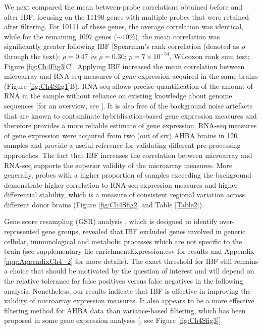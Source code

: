 We next compared the mean between-probe correlations obtained before and after IBF, focusing on the \num{11190} genes with multiple probes that were retained after filtering.
For \num{10111} of these genes, the average correlation was identical, while for the remaining \num{1097} genes ($\sim10\%$), the mean correlation was significantly greater following IBF [Spearman's rank correlation (denoted as $\rho$ through the text): $\rho = 0.47$ \textit{vs} $\rho = 0.30$; $p = 7 \times 10^{-54}$, Wilcoxon rank sum test; Figure \ref{fig:Ch4Fig3}C]. Applying IBF increased the mean correlation between microarray and RNA-seq measures of gene expression acquired in the same brains (Figure \ref{fig:Ch4Sfig1}B). RNA-seq allows precise quantification of the amount of RNA in the sample without reliance on existing knowledge about genome sequences [for an overview, see \citet{Wang2009,Kukurba2015}]. It is also free of the background noise artefacts that are known to contaminate hybridisation-based gene expression measures and therefore provides a more reliable estimate of gene expression. RNA-seq measures of gene expression were acquired from two (out of six) AHBA brains in 120 samples and provide a useful reference for validating different pre-processing approaches. The fact that IBF increases the correlation between microarray and RNA-seq supports the superior validity of the microarray measures. More generally, probes with a higher proportion of samples exceeding the background demonstrate higher correlation to RNA-seq expression measures and higher differential stability, which is a measure of consistent regional variation across different donor brains (Figure \ref{fig:Ch4Sfig2} and Table \ref{Table2}).

Gene score resampling (GSR) analysis \citep{Gillis2010}, which is designed to identify over-represented gene groups, revealed that IBF excluded genes involved in generic cellular, immunological and metabolic processes which are not specific to the brain (see supplementary file enrichmentExpression.csv for results and Appendix \ref{app:AppendixCh4_2} for more details). The exact threshold for IBF still remains a choice that should be motivated by the question of interest and will depend on the relative tolerance for false positives versus false negatives in the following analysis. Nonetheless, our results indicate that IBF is effective in improving the validity of microarray expression measures. It also appears to be a more effective filtering method for AHBA data than variance-based filtering, which has been proposed in some gene expression analyses [\citep{Hackstadt2009}, see Figure \ref{fig:Ch4Sfig3}].


